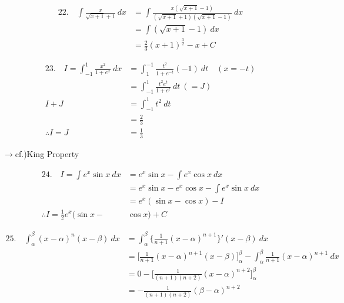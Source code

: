 \documentclass[autodetect-engine,ja=standard, 10.5pt, a4paper, titlepage]{bxjsarticle}
\numberwithin{equation}{section} %
\begin{document}
  \begin{fleqn}[0pt]
    \begin{align*}
      22.\quad \int \frac{x}{\sqrt{x+1} + 1} \:dx
      &= \int \frac{x(\sqrt{x+1}-1)}{(\sqrt{x+1}+1)(\sqrt{x+1}-1)} \:dx \\
      &= \int (\sqrt{x+1}-1)\:dx \\
      &= \frac{2}{3}(x+1)^{\frac{3}{2}} - x + C
    \end{align*}
  \end{fleqn}

  \begin{fleqn}[0pt]
    \begin{align*}
      23.\quad I = \int_{-1}^{1} \frac{x^2}{1 + e^x} \:dx 
      &= \int_{1}^{-1}\frac{t^2}{1+e^{-t}}(-1)\:dt \quad(x = -t)\\
      &= \int_{-1}^{1}\frac{t^2e^t}{1+e^t}\:dt \:(= J) \\
      I + J
      &= \int_{-1}^{1}t^2 \:dt \\
      &= \frac{2}{3} \\
      \therefore I = J &= \frac{1}{3}
    \end{align*}
  \end{fleqn}
  \hspace*{25pt}$\longrightarrow$cf.)King Property

  \begin{fleqn}[0pt]
    \begin{align*}
      24.\quad I = \int e^x \sin x \:dx
      &= e^x\sin x - \int e^x\cos x \:dx \\
      &= e^x\sin x - e^x\cos x - \int e^x\sin x \:dx \\
      &= e^x(\sin x - \cos x) - I \\
      \therefore I = \frac{1}{2}e^x(\sin x - &\cos x) + C
    \end{align*}
  \end{fleqn}

  \begin{fleqn}[0pt]
    \begin{align*}
      25.\quad \int_{\alpha}^{\beta} (x-\alpha)^n (x-\beta) \: dx
      &= \int_{\alpha}^{\beta} \biggl\{\frac{1}{n+1}(x-\alpha)^{n+1}\biggr\}'(x-\beta)\:dx \\
      &= \bigg[\frac{1}{n+1}(x-\alpha)^{n+1}(x-\beta)\bigg]_{\alpha}^{\beta} - \int_{\alpha}^{\beta}\frac{1}{n+1}(x-\alpha)^{n+1}\:dx \\
      &= 0 - \bigg[ \frac{1}{(n+1)(n+2)}(x-\alpha)^{n+2} \bigg]_{\alpha}^{\beta} \\
      &= -\frac{1}{(n+1)(n+2)}(\beta-\alpha)^{n+2}
    \end{align*}
  \end{fleqn}
\end{document}
